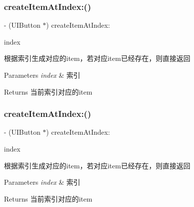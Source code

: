 \subsubsection{\texorpdfstring{create\+Item\+At\+Index\+:()}{createItemAtIndex:()}\hspace{0.1cm}{\footnotesize\ttfamily [2/3]}}
{\footnotesize\ttfamily -\/ (U\+I\+Button $\ast$) create\+Item\+At\+Index\+: \begin{DoxyParamCaption}\item[{(N\+S\+U\+Integer)}]{index }\end{DoxyParamCaption}}

根据索引生成对应的item，若对应item已经存在，则直接返回


\begin{DoxyParams}{Parameters}
{\em index} & 索引\\
\hline
\end{DoxyParams}
\begin{DoxyReturn}{Returns}
当前索引对应的item 
\end{DoxyReturn}
\mbox{\label{interface_v_t_menu_bar_ae78207b0eeb1d9e9597a297db6199403}} 
\subsubsection{\texorpdfstring{create\+Item\+At\+Index\+:()}{createItemAtIndex:()}\hspace{0.1cm}{\footnotesize\ttfamily [3/3]}}
{\footnotesize\ttfamily -\/ (U\+I\+Button $\ast$) create\+Item\+At\+Index\+: \begin{DoxyParamCaption}\item[{(N\+S\+U\+Integer)}]{index }\end{DoxyParamCaption}}

根据索引生成对应的item，若对应item已经存在，则直接返回


\begin{DoxyParams}{Parameters}
{\em index} & 索引\\
\hline
\end{DoxyParams}
\begin{DoxyReturn}{Returns}
当前索引对应的item 
\end{DoxyReturn}
\mbox{\label{interface_v_t_menu_bar_a4a6880a54b350598f4ba913d4d9a3469}} 
